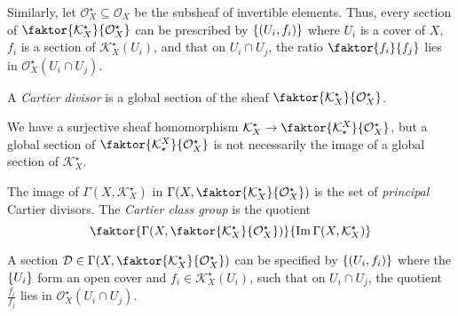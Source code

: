 Similarly, let \( \mathcal O_X^\star \subseteq \mathcal O_X \) be the subsheaf of invertible elements.
Thus, every section of \( \faktor{\mathcal K_X^\star}{\mathcal O_X^\star} \) can be prescribed by \( \qty{(U_i, f_i)} \) where \( U_i \) is a cover of \( X \), \( f_i \) is a section of \( \mathcal K_X^\star(U_i) \), and that on \( U_i \cap U_j \), the ratio \( \faktor{f_i}{f_j} \) lies in \( \mathcal O_X^\star(U_i \cap U_j) \).
\begin{definition}
    A \emph{Cartier divisor} is a global section of the sheaf \( \faktor{\mathcal K_X^\star}{\mathcal O_X^\star} \).
\end{definition}
We have a surjective sheaf homomorphism \( \mathcal K_X^\star \to \faktor{\mathcal K^X_\star}{\mathcal O_X^\star} \), but a global section of \( \faktor{\mathcal K^X_\star}{\mathcal O_X^\star} \) is not necessarily the image of a global section of \( \mathcal K_X^\star \).
\begin{definition}
    The image of \( \Gamma(X, \mathcal K_X^\star) \) in \( \Gamma\qty(X, \faktor{\mathcal K_X^\star}{\mathcal O_X^\star}) \) is the set of \emph{principal} Cartier divisors.
    The \emph{Cartier class group} is the quotient
    \[ \faktor{\Gamma\qty(X, \faktor{\mathcal K_X^\star}{\mathcal O_X^\star})}{\Im \Gamma(X, \mathcal K_X^\star)} \]
\end{definition}
A section \( \mathcal D \in \Gamma\qty(X, \faktor{\mathcal K_X^\star}{\mathcal O_X^\star}) \) can be specified by \( \qty{(U_i, f_i)} \) where the \( \qty{U_i} \) form an open cover and \( f_i \in \mathcal K_X^\star(U_i) \), such that on \( U_i \cap U_j \), the quotient \( \frac{f_i}{f_j} \) lies in \( \mathcal O_X^\star(U_i \cap U_j) \).

